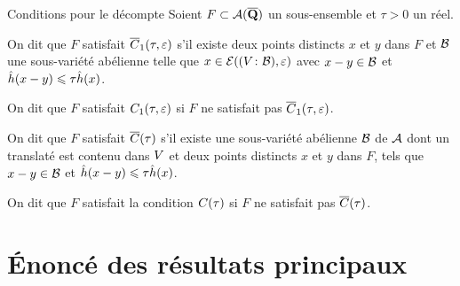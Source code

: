 \documentclass{mpg-thslides}
\begin{document}
\begin{frame}{Conditions pour le décompte}
  Soient \( F \subset \mathcal A(\overline{{\mathbf{Q}}}) \) un sous-ensemble et \( \tau > 0 \) un
  réel.
  \begin{tdef}
    On dit que \( F \) satisfait \( \condi*\tau\eps \) s'il existe deux points
    distincts \( x \) et \( y \) dans \( F \) et \( \mathcal B \) une sous-variété
    abélienne telle que \( x \in \mathcal E((V\colon\mathcal B), \varepsilon) \) avec \( x - y
      \in \mathcal B \) et \( \hat h ( x-y ) \leqslant \tau \hat h (x) \).

    On dit que \( F \) satisfait \( \condi\tau\eps \) si \( F \)
    ne satisfait pas \( \condi*\tau\eps \).
  \end{tdef}

  \begin{tdef}
    On dit que \( F \) satisfait \( \cond*\tau \) s'il existe une
    sous-variété abélienne \( \mathcal B \) de \( \mathcal A \) dont un translaté est contenu
    dans \( V \) et deux points distincts \( x \) et \( y \) dans \( F \),
    tels que \( x - y \in \mathcal B \) et \( \hat h ( x-y ) \leqslant \tau \hat h (x) \).

    On dit que \( F \) satisfait la condition \( \cond\tau \) si \( F \) ne
    satisfait pas \( \cond*\tau \).
  \end{tdef}
\end{frame}



\section[Résultats]{Énoncé des résultats principaux}
\tocsect
\end{document}
